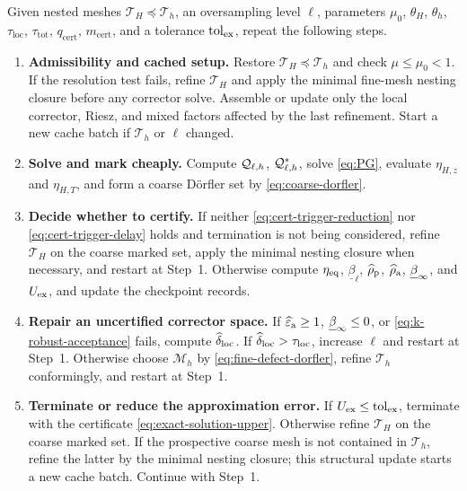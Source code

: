 \begin{algorithm}
\label{alg:exact-adaptive}
Given nested meshes $\mathcal T_H\preceq\mathcal T_h$, an oversampling
level $\ell$, parameters $\mu_0$, $\theta_H$, $\theta_h$,
$\tau_{\mathrm{loc}}$, $\tau_{\mathrm{tot}}$,
$q_{\mathrm{cert}}$, $m_{\mathrm{cert}}$, and a tolerance $\mathrm{tol}_{\mathrm{ex}}$,
repeat the following steps.
\begin{enumerate}
\item \textbf{Admissibility and cached setup.}
Restore $\mathcal T_H\preceq\mathcal T_h$ and check
$\mu\leq\mu_0<1$.  If the resolution test fails, refine
$\mathcal T_H$ and apply the minimal fine-mesh nesting closure before any
corrector solve.  Assemble or update only the local corrector, Riesz, and
mixed factors affected by the last refinement.  Start a new cache batch if
$\mathcal T_h$ or $\ell$ changed.

\item \textbf{Solve and mark cheaply.}
Compute $\mathcal Q_{\ell,h}$, $\mathcal Q_{\ell,h}^*$, solve \eqref{eq:PG}, evaluate
$\eta_{H,z}$ and $\eta_{H,T}$, and form a coarse D\"orfler set by
\eqref{eq:coarse-dorfler}.

\item \textbf{Decide whether to certify.}
If neither \eqref{eq:cert-trigger-reduction} nor
\eqref{eq:cert-trigger-delay} holds and termination is not being
considered, refine $\mathcal T_H$ on the coarse marked set, apply the
minimal nesting closure when necessary, and restart at Step~1.  Otherwise
compute $\eta_{\mathrm{eq}}$, $\underline\beta_\ell$, $\widehat\rho_{\mathrm p}$, $\widehat\rho_{\mathrm a}$,
$\underline\beta_\infty$, and $U_{\mathrm{ex}}$, and update the checkpoint records.

\item \textbf{Repair an uncertified corrector space.}
If $\widehat\varepsilon_{\mathrm a}\geq1$, $\underline\beta_\infty\leq0$, or
\eqref{eq:k-robust-acceptance} fails, compute $\widehat\delta_{\mathrm{loc}}$.  If
$\widehat\delta_{\mathrm{loc}}>\tau_{\mathrm{loc}}$, increase $\ell$ and restart at
Step~1.  Otherwise choose $\mathcal M_h$ by
\eqref{eq:fine-defect-dorfler}, refine $\mathcal T_h$ conformingly, and
restart at Step~1.

\item \textbf{Terminate or reduce the approximation error.}
If $U_{\mathrm{ex}}\leq\mathrm{tol}_{\mathrm{ex}}$, terminate with the certificate
\eqref{eq:exact-solution-upper}.  Otherwise refine $\mathcal T_H$ on the
coarse marked set.  If the prospective coarse mesh is not contained in
$\mathcal T_h$, refine the latter by the minimal nesting closure; this
structural update starts a new cache batch.  Continue with Step~1.
\end{enumerate}
\end{algorithm}

